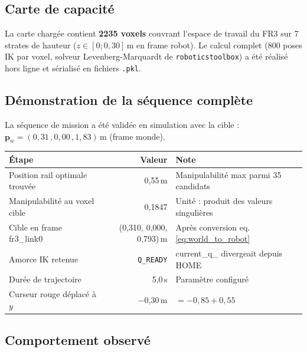 \documentclass[11pt, a4paper]{article}
\begin{document}
\subsection{Carte de capacité}

La carte chargée contient \textbf{2235 voxels} couvrant l'espace de travail du FR3 sur 7 strates de hauteur ($z \in [0; 0{,}30]$\,m en frame robot). Le calcul complet (800 poses IK par voxel, solveur Levenberg-Marquardt de \texttt{roboticstoolbox}) a été réalisé hors ligne et sérialisé en fichiers \texttt{.pkl}.

\subsection{Démonstration de la séquence complète}

La séquence de mission a été validée en simulation avec la cible :
$\mathbf{p}_w = (0{,}31\,, 0{,}00\,, 1{,}83)$\,m (frame monde).

\begin{center}
\begin{tabular}{lrl}
  \toprule
  \rowcolor{LightTeal}
  \textbf{Étape} & \textbf{Valeur} & \textbf{Note} \\
  \midrule
  Position rail optimale trouvée & 0,55\,m       & Manipulabilité max parmi 35 candidats \\
  Manipulabilité au voxel cible  & 0,1847        & Unité : produit des valeurs singulières \\
  Cible en frame fr3\_link0      & (0,310, 0,000, 0,793)\,m & Après conversion eq.\,\eqref{eq:world_to_robot} \\
  Amorce IK retenue              & \texttt{Q\_READY} & current\_q\_ divergeait depuis HOME \\
  Durée de trajectoire           & 5,0\,s        & Paramètre configuré \\
  Curseur rouge déplacé à $y$    & −0,30\,m      & $= -0{,}85 + 0{,}55$ \\
  \bottomrule
\end{tabular}
\end{center}

\subsection{Comportement observé}
\end{document}
